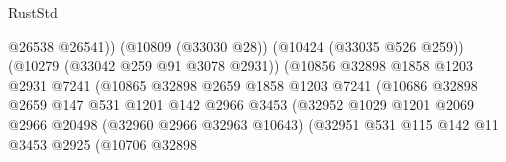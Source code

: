 \begin{lexlean}{RustStd}
\begin{coremodule}
                                                    @26538
                                                    @26541))
                                                (@10809 (@33030 @28))
                                                (@10424 (@33035 @526 @259))
                                                (@10279 (@33042 @259 @91 @3078 @2931))
                                                (@10856
                                                  @32898
                                                  @1858
                                                  @1203
                                                  @2931
                                                  @7241
                                                  (@10865
                                                    @32898
                                                    @2659
                                                    @1858
                                                    @1203
                                                    @7241
                                                    (@10686
                                                      @32898
                                                      @2659
                                                      @147
                                                      @531
                                                      @1201
                                                      @142
                                                      @2966
                                                      @3453
                                                      (@32952
                                                        @1029
                                                        @1201
                                                        @2069
                                                        @2966
                                                        @20498
                                                        (@32960 @2966 @32963 @10643)
                                                        (@32951
                                                          @531
                                                          @115
                                                          @142
                                                          @11
                                                          @3453
                                                          @2925
                                                          (@10706
                                                            @32898

\end{coremodule}
\end{lexlean}
